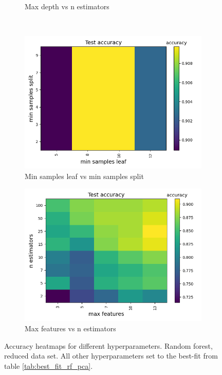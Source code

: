 \documentclass[a4paper]{article}
\begin{document}
\begin{figure}[H]
\begin{subfigure}{0.49\textwidth}
    \caption{Max depth vs n estimators}
  \end{subfigure}\\
  \begin{subfigure}{0.49\textwidth}
    \includegraphics[scale=0.45]{../figures/random_forest/heatmaps/heatmap_nbins200_pca35_seed4155_ts0.20_accuracy_min_samples_leaf_min_samples_split.png}
    \caption{Min samples leaf vs min samples split}
  \end{subfigure}
  \begin{subfigure}{0.49\textwidth}
    \includegraphics[scale=0.45]{../figures/random_forest/heatmaps/heatmap_nbins200_pca35_seed4155_ts0.20_accuracy_max_features_n_estimators.png}
    \caption{Max features vs n estimators}
  \end{subfigure}
  \caption{Accuracy heatmaps for different hyperparameters. Random forest, reduced data set. All other hyperparameters set to the best-fit from table \ref{tab:best_fit_rf_pca}.}
  \label{fig:app_rf_pca}
\end{figure}
\end{document}
